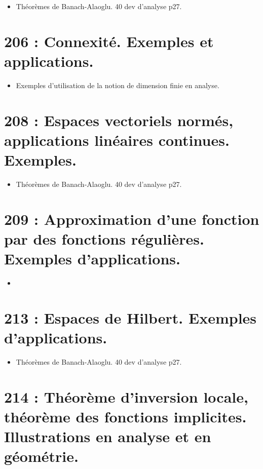 \documentclass[a4paper,10pt,oneside,twocolumn,landscape]{book}
\begin{document}
\begin{itemize}
	\item Théorèmes de Banach-Alaoglu. 40 dev d'analyse p27.
\end{itemize}



\section{206 : Connexité. Exemples et applications.}

\begin{itemize}
	\item Exemples d’utilisation de la notion de dimension finie en analyse.
\end{itemize}


\section{208 : Espaces vectoriels normés, applications linéaires continues. Exemples.}

\begin{itemize}
	\item Théorèmes de Banach-Alaoglu. 40 dev d'analyse p27.
\end{itemize}

\section{209 : Approximation d’une fonction par des fonctions régulières. Exemples d’applications.}

\begin{itemize}
	\item 
\end{itemize}

\section{213 : Espaces de Hilbert. Exemples d’applications.}

\begin{itemize}
	\item Théorèmes de Banach-Alaoglu. 40 dev d'analyse p27.
\end{itemize}

\section{214 : Théorème d’inversion locale, théorème des fonctions implicites. Illustrations en analyse et en géométrie.}
\end{document}
